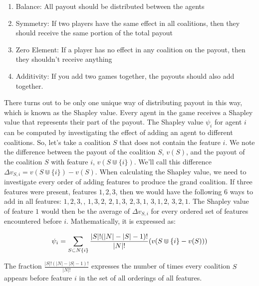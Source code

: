 \begin{enumerate}

    \item Balance: All payout should be distributed between the agents

    \item Symmetry: If two players have the same effect in all coalitions, then
          they should receive the same portion of the total payout

    \item Zero Element: If a player has no effect in any coalition on the
          payout, then they shouldn't receive anything

    \item Additivity: If you add two games together, the payouts should also
          add together. %

\end{enumerate}

There turns out to be only one unique way of distributing payout in this way,
which is known as the Shapley value. Every agent in the game receives a Shapley
value that represents their part of the payout. The Shapley value $\psi_i$ for
agent $i$ can be computed by investigating the effect of adding an agent to
different coalitions. So, let's take a coalition $S$ that does not contain the
feature $i$. We note the difference between the payout of the coalition $S$,
$v(S)$, and the payout of the coalition $S$ with feature $i$, $v(S \Cup
\{i\})$. We'll call this difference $\Delta v_{S,i} = v(S \Cup \{i\}) - v(S)$.
When calculating the Shapley value, we need to investigate every order of
adding features to produce the grand coalition. If three features were present,
features $1,2,3$, then we would have the following 6 ways to add in all
features: $1,2,3,$, $1,3,2$, $2,1,3$, $2,3,1$, $3,1,2$, $3,2,1$. The Shapley
value of feature $1$ would then be the average of $\Delta v_{S,i}$ for every
ordered set of features encountered before $i$. Mathematically, it is expressed
as:

\begin{equation}
    \psi_i = \sum_{S \subset N \\ \{i\}} \frac{|S|! (|N|-|S|-1)!}{|N|!} (v(S \Cup \{i\} - v(S)))
\end{equation}

The fraction $\frac{|S|! (|N|-|S|-1)!}{|N|!}$ expresses the number of times
every coalition $S$ appears before feature $i$ in the set of all orderings of
all features.

